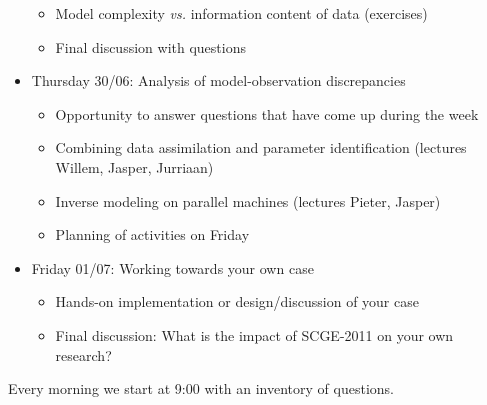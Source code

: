 \begin{itemize}
\begin{itemize}
\item{Model complexity \textit{vs.} information content of data (exercises)}
\item{Final discussion with questions}
\end{itemize}
\item[]{Thursday 30/06: Analysis of model-observation discrepancies}
\begin{itemize}
\item{Opportunity to answer questions that have come up during the week}
\item{Combining data assimilation and parameter identification (lectures Willem, Jasper, Jurriaan)}
\item{Inverse modeling on parallel machines (lectures Pieter, Jasper)}
\item{Planning of activities on Friday}
\end{itemize}
\item[]{Friday 01/07: Working towards your own case}
\begin{itemize}
\item{Hands-on implementation or design/discussion of your case}
\item{Final discussion: What is the impact of SCGE-2011 on your own research?}
\end{itemize}
\end{itemize}

Every morning we start at 9:00 with an inventory of questions.